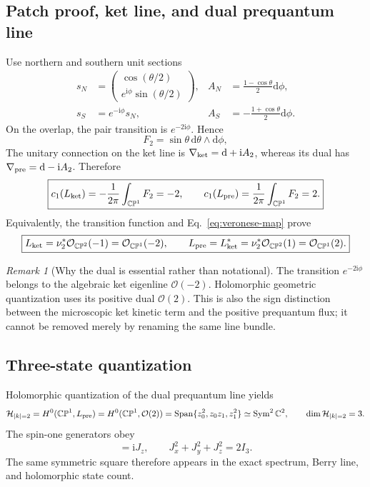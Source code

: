 \documentclass[11pt]{article}
\theoremstyle{definition}
\theoremstyle{remark}
\newtheorem{remark}[theorem]{Remark}
\newcommand{\CP}{\mathbb{CP}}
\newcommand{\CC}{\mathbb{C}}
\newcommand{\cO}{\mathcal O}
\newcommand{\cH}{\mathcal H}
\newcommand{\ii}{\mathrm i}
\newcommand{\dd}{\mathrm d}
\newcommand{\Span}{\operatorname{Span}}
\newcommand{\Sym}{\operatorname{Sym}}
\begin{document}
\subsection{Patch proof, ket line, and dual prequantum line}

Use northern and southern unit sections
\begin{align}
 s_N&=\begin{pmatrix}\cos(\theta/2)\\e^{\ii\phi}\sin(\theta/2)\end{pmatrix},
 &A_N&=\frac{1-\cos\theta}{2}\dd\phi,\\
 s_S&=e^{-\ii\phi}s_N,
 &A_S&=-\frac{1+\cos\theta}{2}\dd\phi.
\end{align}
On the overlap, the pair transition is \(e^{-2\ii\phi}\).  Hence
\begin{equation}
 F_2=\sin\theta\,\dd\theta\wedge\dd\phi,
\end{equation}
The unitary connection on the ket line is
\(\nabla_{\rm ket}=\dd+\ii A_2\), whereas its dual has
\(\nabla_{\rm pre}=\dd-\ii A_2\).  Therefore
\begin{equation}
 \boxed{
 c_1(L_{\rm ket})=-\frac1{2\pi}\int_{\CP^1}F_2=-2,
 \qquad
 c_1(L_{\rm pre})=\frac1{2\pi}\int_{\CP^1}F_2=2.}
 \label{eq:chern-two}
\end{equation}
Equivalently, the transition function and Eq.~\eqref{eq:veronese-map} prove
\begin{equation}
 \boxed{
 L_{\rm ket}=\nu_2^*\cO_{\CP^2}(-1)=\cO_{\CP^1}(-2),
 \qquad
 L_{\rm pre}=L_{\rm ket}^*=\nu_2^*\cO_{\CP^2}(1)
 =\cO_{\CP^1}(2).}
 \label{eq:bundle-pullback}
\end{equation}

\begin{remark}[Why the dual is essential rather than notational]
The transition \(e^{-2\ii\phi}\) belongs to the algebraic ket eigenline
\(\cO(-2)\).  Holomorphic geometric quantization uses its positive dual
\(\cO(2)\).  This is also the sign distinction between the microscopic ket
kinetic term and the positive prequantum flux; it cannot be removed merely by
renaming the same line bundle.
\end{remark}

\subsection{Three-state quantization}

Holomorphic quantization of the dual prequantum line yields
\begin{equation}
 \cH_{|k|=2}=H^0(\CP^1,L_{\rm pre})=H^0(\CP^1,\cO(2))
 =\Span\{z_0^2,z_0z_1,z_1^2\}
 \simeq\Sym^2\CC^2,\qquad \dim\cH_{|k|=2}=3.
 \label{eq:borel-weil}
\end{equation}
The spin-one generators obey
\begin{equation}
 [J_x,J_y]=\ii J_z,\qquad J_x^2+J_y^2+J_z^2=2I_3.
\end{equation}
The same symmetric square therefore appears in the exact spectrum, Berry
line, and holomorphic state count.
\end{document}
